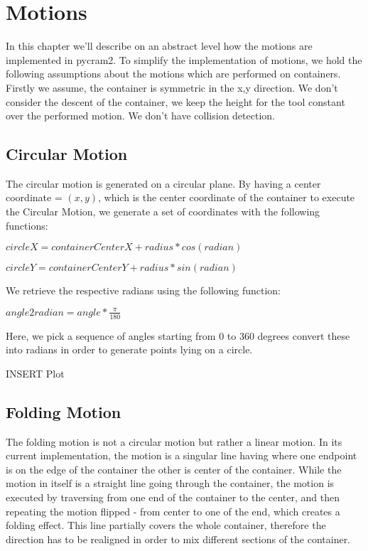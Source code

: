 \chapter{Motions}
\label{chap:Motions}

In this chapter we'll describe on an abstract level how the motions are implemented in pycram2.
To simplify the implementation of motions, we hold the following assumptions about the motions which are performed on containers.
Firstly we assume, the container is symmetric in the x,y direction. We don't consider the descent of the container, we keep the height for the tool
constant over the performed motion. We don't have collision detection.

\section{Circular Motion}
The circular motion is generated on a circular plane. 
By having a center coordinate = $(x,y)$, which is the center coordinate of 
the container to execute the Circular Motion, we generate a set of coordinates
with the following functions: 

$circleX = containerCenterX + radius * cos(radian)$

$circleY = containerCenterY + radius * sin(radian)$

We retrieve the respective radians using the following function:

$ angle2radian = angle * \frac{\pi}{180} $

Here, we pick a sequence of angles starting from
0 to 360 degrees convert these into radians in order to generate points lying on a circle.

INSERT Plot

\section{Folding Motion}
The folding motion is not a circular motion but rather a linear motion. In its current implementation, the motion is a singular line having where one endpoint is on the edge of the container
the other is center of the container. While the motion in itself is a straight line going through the container, the motion is executed by traversing from one end of the container to the center,
and then repeating the motion flipped - from center to one of the end, which creates a folding effect.
This line partially covers the whole container, therefore the direction has to be realigned in order to mix different sections of the container.

